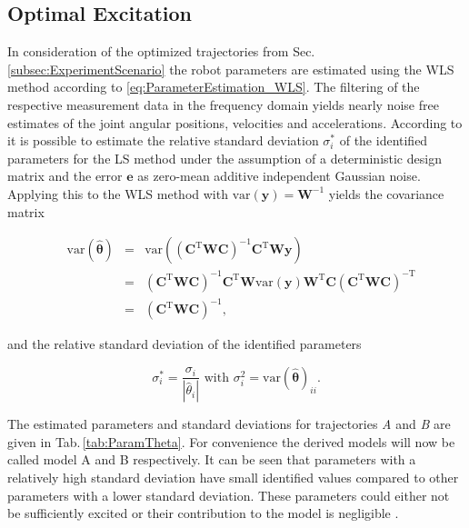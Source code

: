 
\subsection{Optimal Excitation}
\label{subsec:OptimalExcitation_Result}


In consideration of the optimized trajectories from Sec.\,\ref{subsec:ExperimentScenario} the robot parameters are estimated using the WLS method according to \eqref{eq:ParameterEstimation_WLS}. The filtering of the respective measurement data in the frequency domain yields nearly noise free estimates of the joint angular positions, velocities and accelerations. According to \cite{Khalil.2006} it is possible to estimate the relative standard deviation $\sigma_{i}^*$ of the identified parameters for the LS method under the assumption of a deterministic design matrix and the error $\boldsymbol{e}$ as zero-mean additive independent Gaussian noise. Applying this to the WLS method with $\mathrm{var}(\boldsymbol{y}) = \boldsymbol{W}^{-1}$ yields the covariance matrix

\begin{equation}\label{eq:ParaVar}
	\begin{aligned}
&	\mathrm{var}(\hat{\boldsymbol{\theta}}) &= {}& \mathrm{var}((\boldsymbol{C}^\mathrm{T} \boldsymbol{W} \boldsymbol{C})^{-1} \boldsymbol{C}^\mathrm{T} \boldsymbol{W} \boldsymbol{y}) \\
&								&= {}& (\boldsymbol{C}^\mathrm{T} \boldsymbol{W} \boldsymbol{C})^{-1} \boldsymbol{C}^\mathrm{T} \boldsymbol{W} \mathrm{var}(\boldsymbol{y}) \boldsymbol{W}^\mathrm{T} \boldsymbol{C} (\boldsymbol{C}^\mathrm{T} \boldsymbol{W} \boldsymbol{C})^{-\mathrm{T}} \\
&								&= {}& (\boldsymbol{C}^\mathrm{T} \boldsymbol{W} \boldsymbol{C})^{-1},
	\end{aligned}
\end{equation}

and the relative standard deviation of the identified parameters

\begin{equation}\label{eq:ParaVar_rel}
	\sigma_{i}^* = \frac{\sigma_{i}}{\left| \hat{\theta}_i \right|} \text{ with } \sigma_{i}^2 = \mathrm{var}(\hat{\boldsymbol{\theta}})_{ii}.
\end{equation}

The estimated parameters and standard deviations for trajectories \textit{A} and \textit{B} are given in Tab.\,\ref{tab:ParamTheta}. For convenience the derived models will now be called model A and B respectively. It can be seen that parameters with a relatively high standard deviation have small identified values compared to other parameters with a lower standard deviation. These parameters could either not be sufficiently excited or their contribution to the model is negligible \cite{Khalil.2006}.

